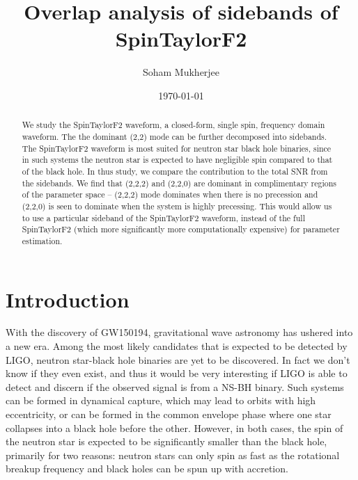 \documentclass[nofootinbib,preprintnumbers,superscriptaddress,notitlepage]{revtex4-1}
\newcommand{\<}{\begin{equation}}
\newcommand{\?}{\end{equation}}
\begin{document}
\title{Overlap analysis of sidebands of SpinTaylorF2}

\author{Soham Mukherjee}
\date{\today}

\begin{abstract}
We study the SpinTaylorF2 waveform, a closed-form, single spin, frequency 
domain waveform. The the dominant (2,2) mode can be further decomposed 
into sidebands. The SpinTaylorF2 waveform is most suited for neutron star 
black hole binaries, since in such systems the neutron star is expected to 
have negligible spin compared to that of the black hole. In thus study, we 
compare the contribution to the total SNR from the sidebands. We find that 
(2,2,2) and (2,2,0) are dominant in complimentary regions of the parameter 
space -- (2,2,2) mode dominates when there is no precession and (2,2,0) is 
seen to dominate when the system is highly precessing. This would allow us 
to use a particular sideband of the SpinTaylorF2 waveform, instead of the
full SpinTaylorF2 (which more significantly more computationally expensive) 
for parameter estimation. 
\end{abstract}

\maketitle

\section{Introduction}
With the discovery of GW150194, gravitational wave astronomy has ushered into
a new era. Among the most likely candidates that is expected to be detected by
LIGO, neutron star-black hole binaries are yet to be discovered. In fact we 
don't know if they even exist, and thus it would be very interesting if LIGO
is able to detect and discern if the observed signal is from a NS-BH binary. 
Such systems can be formed in dynamical capture, which may lead to orbits with 
high eccentricity, or can be formed in the common envelope phase where one star 
collapses into a black hole before the other. However, in both cases, the spin 
of the neutron star is expected to be significantly smaller than the black hole,
primarily for two reasons: neutron stars can only spin as fast as the rotational 
breakup frequency and black holes can be spun up with accretion. 
\end{document}

